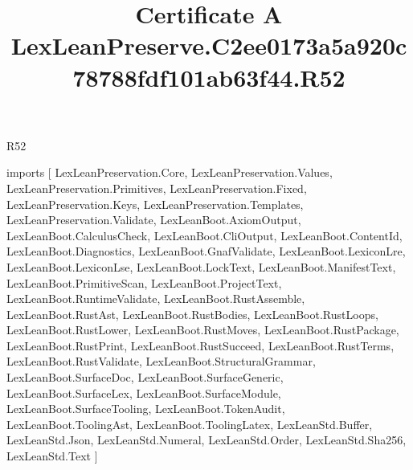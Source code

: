\begin{lexlean}{R52}
\title{Certificate A LexLeanPreserve.C2ee0173a5a920c78788fdf101ab63f44.R52}
\begin{coremodule}
imports [
  LexLeanPreservation.Core,
  LexLeanPreservation.Values,
  LexLeanPreservation.Primitives,
  LexLeanPreservation.Fixed,
  LexLeanPreservation.Keys,
  LexLeanPreservation.Templates,
  LexLeanPreservation.Validate,
  LexLeanBoot.AxiomOutput,
  LexLeanBoot.CalculusCheck,
  LexLeanBoot.CliOutput,
  LexLeanBoot.ContentId,
  LexLeanBoot.Diagnostics,
  LexLeanBoot.GnafValidate,
  LexLeanBoot.LexiconLre,
  LexLeanBoot.LexiconLse,
  LexLeanBoot.LockText,
  LexLeanBoot.ManifestText,
  LexLeanBoot.PrimitiveScan,
  LexLeanBoot.ProjectText,
  LexLeanBoot.RuntimeValidate,
  LexLeanBoot.RustAssemble,
  LexLeanBoot.RustAst,
  LexLeanBoot.RustBodies,
  LexLeanBoot.RustLoops,
  LexLeanBoot.RustLower,
  LexLeanBoot.RustMoves,
  LexLeanBoot.RustPackage,
  LexLeanBoot.RustPrint,
  LexLeanBoot.RustSucceed,
  LexLeanBoot.RustTerms,
  LexLeanBoot.RustValidate,
  LexLeanBoot.StructuralGrammar,
  LexLeanBoot.SurfaceDoc,
  LexLeanBoot.SurfaceGeneric,
  LexLeanBoot.SurfaceLex,
  LexLeanBoot.SurfaceModule,
  LexLeanBoot.SurfaceTooling,
  LexLeanBoot.TokenAudit,
  LexLeanBoot.ToolingAst,
  LexLeanBoot.ToolingLatex,
  LexLeanStd.Buffer,
  LexLeanStd.Json,
  LexLeanStd.Numeral,
  LexLeanStd.Order,
  LexLeanStd.Sha256,
  LexLeanStd.Text
]


\end{coremodule}
\end{lexlean}
